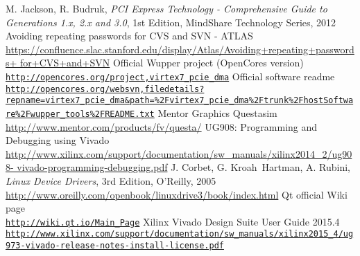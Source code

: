 \begin{thebibliography}{9}
  M. Jackson, R. Budruk, \textit{PCI Express Technology - Comprehensive Guide to Generations 1.x, 2.x and 3.0}, 1st Edition, MindShare Technology Series, 2012\\
  Avoiding repeating passwords for CVS and SVN - ATLAS\\
  \href{https://confluence.slac.stanford.edu/display/Atlas/Avoiding+repeating+passwords+for+CVS+and+SVN}{https://confluence.slac.stanford.edu/display/Atlas/Avoiding+repeating+passwords+ for+CVS+and+SVN}
  Official Wupper project (OpenCores version)\\
  \href{http://opencores.org/project,virtex7_pcie_dma}{\nolinkurl{http://opencores.org/project,virtex7\_pcie\_dma}}
  Official software readme\\
  \href{http://opencores.org/websvn,filedetails?repname=virtex7\_pcie\_dma&path=\%2Fvirtex7_pcie_dma\%2Ftrunk\%2FhostSoftware\%2Fwupper_tools\%2FREADME.txt}{\nolinkurl{http://opencores.org/websvn,filedetails?repname=virtex7_pcie_dma&path=\%2Fvirtex7_pcie_dma\%2Ftrunk\%2FhostSoftware\%2Fwupper_tools\%2FREADME.txt}}
  Mentor Graphics Questasim\\
  \href{http://www.mentor.com/products/fv/questa/}{http://www.mentor.com/products/fv/questa/}
  UG908: Programming and Debugging using Vivado\\
  \href{http://www.xilinx.com/support/documentation/sw_manuals/xilinx2014_2/ug908-vivado-programming-debugging.pdf}{http://www.xilinx.com/support/documentation/sw\_manuals/xilinx2014\_2/ug908- vivado-programming-debugging.pdf}
  J. Corbet, G. Kroah\ Hartman, A. Rubini, \textit{Linux Device Drivers}, 3rd Edition, O'Reilly, 2005\\
  \href{http://www.oreilly.com/openbook/linuxdrive3/book/index.html}{http://www.oreilly.com/openbook/linuxdrive3/book/index.html}
  Qt official Wiki page\\
  \href{http://wiki.qt.io/Main_Page}{\nolinkurl{http://wiki.qt.io/Main\_Page}}
  Xilinx Vivado Design Suite User Guide 2015.4\\
  \href{http://www.xilinx.com/support/documentation/sw_manuals/xilinx2015_4/ug973-vivado-release-notes-install-license.pdf}{\nolinkurl{http://www.xilinx.com/support/documentation/sw\_manuals/xilinx2015\_4/ug973-vivado-release-notes-install-license.pdf}}

\end{thebibliography}
